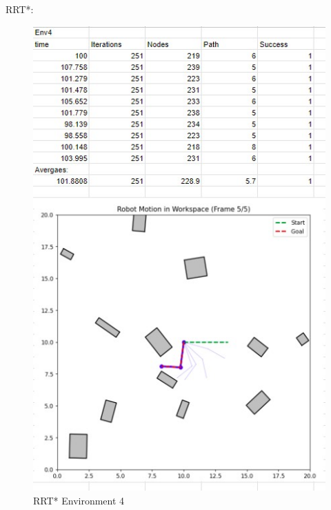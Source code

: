 \documentclass{article}
\begin{document}
    RRT*: 
    \begin{figure} [H]
        \centering
        \includegraphics[width=0.5\linewidth]{latex_media/RRTStarEnv4Stats.jpg}
        \caption{RRT* Environment 4}
    \end{figure}
\end{document}
